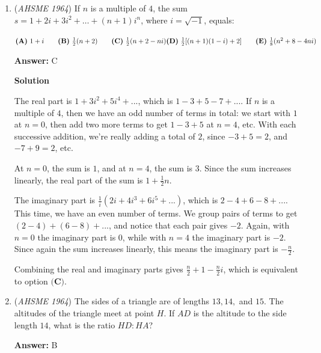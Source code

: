 \begin{enumerate}
 We also have $a^2 + d^2 = 4^2$ and $b^2 + c^2 = x^2$, leading to $a^2 + b^2 + c^2 + d^2 = 16 + x^2$.

 Thus, $34 = 16 + x^2$, or $x = \sqrt{18} = 3\sqrt{2}$, which is option $\boxed{\textbf{(B)}}$



	\item (\textit{AHSME 1964}) If $n$ is a multiple of $4$, the sum $s=1+2i+3i^2+ \ldots +(n+1)i^{n}$, where $i=\sqrt{-1}$, equals:


 $\textbf{(A)}\ 1+i\qquad \textbf{(B)}\ \frac{1}{2}(n+2) \qquad \textbf{(C)}\ \frac{1}{2}(n+2-ni) \qquad \\ \textbf{(D)}\ \frac{1}{2}[(n+1)(1-i)+2]\qquad \textbf{(E)}\ \frac{1}{8}(n^2+8-4ni)$

 \textbf{Answer: }C



\textbf{Solution}

The real part is $1 + 3i^2 + 5i^4 + ...$, which is $1 - 3 + 5 - 7 + ...$.  If $n$ is a multiple of $4$, then we have an odd number of terms in total:  we start with $1$ at $n=0$, then add two more terms to get $1 - 3 + 5$ at $n=4$, etc.  With each successive addition, we're really adding a total of $2$, since $-3 + 5 = 2$, and $-7 + 9 = 2$, etc.  

 At $n = 0$, the sum is $1$, and at $n=4$, the sum is $3$.  Since the sum increases linearly, the real part of the sum is $1 + \frac{1}{2}n$.

 The imaginary part is $\frac{1}{i}(2i + 4i^3 + 6i^5 + ...)$, which is $2 - 4 + 6 - 8 + ...$.  This time, we have an even number of terms.  We group pairs of terms to get $(2-4) + (6-8) + ...$, and notice that each pair gives $-2$.  Again, with $n=0$ the imaginary part is $0$, while with $n=4$ the imaginary part is $-2$.  Since again the sum increases linearly, this means the imaginary part is $-\frac{n}{2}$.

 Combining the real and imaginary parts gives $\frac{n}{2} + 1 - \frac{n}{2}i$, which is equivalent to option $\boxed{\textbf{(C)}}$.

 


	\item (\textit{AHSME 1964}) The sides of a triangle are of lengths $13, 14,$ and $15$. The altitudes of the triangle meet at point $H$. 
If $AD$ is the altitude to the side length $14$, what is the ratio $HD:HA$?     


 
 \textbf{Answer: }B




\end{enumerate}
